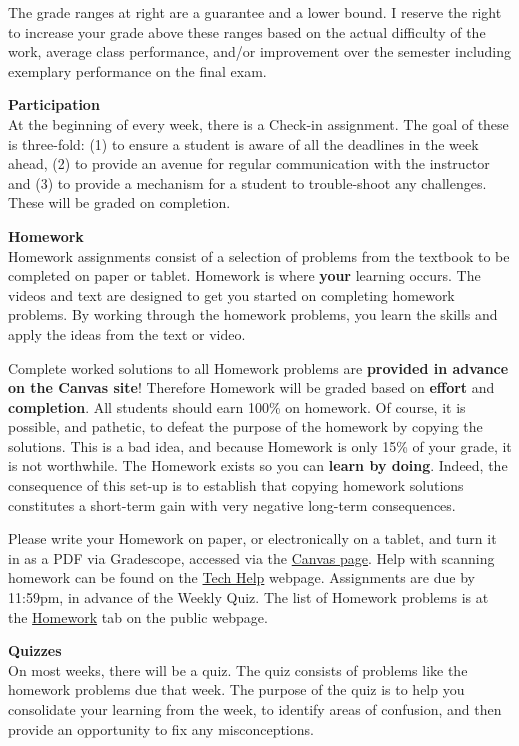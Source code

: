 \documentclass[12pt]{article}
\renewcommand{\emph}[1]{\textsf{\textbf{#1}}}
\newcommand{\localhead}[1]{\par\smallskip\textbf{#1} \smallskip\nobreak\\}%
\def\heading#1{\localhead{\large\emph{#1}}}
\begin{document}
The grade ranges at right are a guarantee and a lower bound. I reserve the right to increase your grade above these ranges based on the actual difficulty of the work, average class performance, and/or improvement over the semester including exemplary performance on the final exam. 

\heading{Participation}
At the beginning of every week, there is a Check-in assignment. The goal of these is three-fold: (1) to ensure a student is aware of all the deadlines in the week ahead, (2) to provide an avenue for regular communication with the instructor and (3) to provide a mechanism for a student to trouble-shoot any challenges. These will be graded on completion. 

\newpage
\heading{Homework}
Homework assignments consist of a selection of problems from the textbook to be completed on paper or tablet.  Homework is where \textbf{your} learning occurs. The videos and text are designed to get you started on completing homework problems. By working through the homework problems, you learn the skills and apply the ideas from the text or video.

Complete worked solutions to all Homework problems are \emph{provided in advance on the Canvas site}!  Therefore Homework will be graded based on \emph{effort} and \emph{completion}.  All students should earn 100\% on homework.  Of course, it is possible, and pathetic, to defeat the purpose of the homework by copying the solutions.  This is a bad idea, and because Homework is only 15\% of your grade, it is not worthwhile.  The Homework exists so you can \emph{learn by doing}. Indeed, the consequence of this set-up is to establish that copying homework solutions constitutes a short-term gain with very negative long-term consequences. 

Please write your Homework on paper, or electronically on a tablet, and turn it in as a PDF via Gradescope, accessed via the \href{https://canvas.alaska.edu/courses/21589}{Canvas page}.  Help with scanning homework can be found on the \href{https://uaf-math251.github.io/techHelp.html}{Tech Help} webpage.  Assignments are due by 11:59pm, in advance of the Weekly Quiz. The list of Homework problems is at the \href{https://uaf-math251.github.io/calc2/homework.html}{Homework} tab on the public webpage.

\heading{Quizzes}
On most weeks, there will be a quiz.  The quiz consists of problems like the homework problems due that week. The purpose of the quiz is to help you consolidate your learning from the week, to identify areas of confusion, and then provide an opportunity to fix any misconceptions.  
\end{document}
